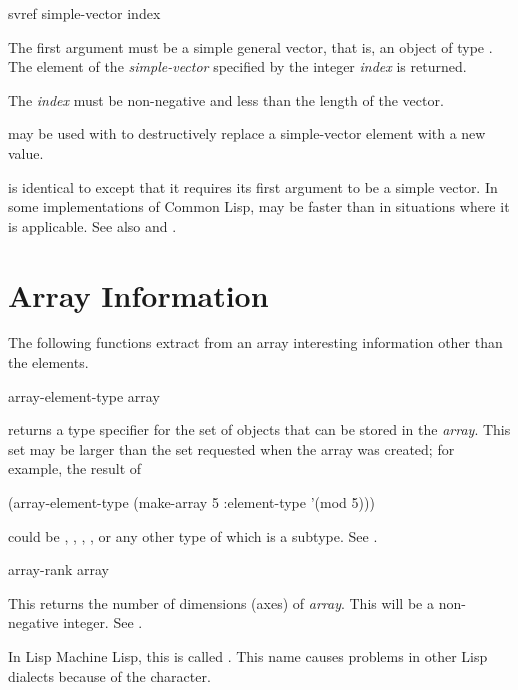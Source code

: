 \begin{defun}[Function]
svref simple-vector index

The first argument must be a simple general vector,
that is, an object of type .
The element of the {\it simple-vector} specified by the integer {\it index}
is returned.

The {\it index} must be non-negative and less than
the length of the vector.

 may be used with  to destructively replace
a simple-vector element with a new value.

 is identical to  except that it requires its first
argument to be a simple vector.  In some implementations of Common Lisp,
 may be faster than  in situations where it is applicable.
See also  and .
\end{defun}

\section{Array Information}

The following functions extract from an array
interesting information other than the elements.

\begin{defun}[Function]
array-element-type array

 returns a type specifier for the set of objects
that can be stored in the {\it array}.  This set may be larger than the
set requested when the array was created; for example,
the result of
\begin{lisp}
(array-element-type (make-array 5 :element-type '(mod 5)))
\end{lisp}
could be , , , , or any other
type of which  is a subtype.  See .
\end{defun}

\begin{defun}[Function]
array-rank array

This returns the number of dimensions (axes) of {\it array}.
This will be a non-negative integer.
See .

\beforenoterule
\begin{incompatibility}
In Lisp Machine Lisp, this is called .
This name causes problems in other Lisp dialects
because of the \cd{\#} character.
\end{incompatibility}
\afternoterule
\end{defun}

